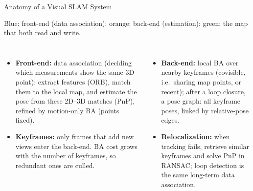 \begin{frame}{Anatomy of a Visual SLAM System}
  \vspace{0.1em}
  {\centering\scriptsize Blue: front-end (data association); orange: back-end (estimation); green: the map that both read and write.\par}
  \vspace{0.1em}
  \begin{columns}[T,onlytextwidth]
      \begin{itemize}\scriptsize\itemsep0.2em
        \item \textbf{Front-end:} data association (deciding which measurements show the same 3D point): extract features (ORB), match them to the local map, and estimate the pose from these 2D--3D matches (PnP), refined by motion-only BA (points fixed).
        \item \textbf{Keyframes:} only frames that add new views enter the back-end. BA cost grows with the number of keyframes, so redundant ones are culled.
      \end{itemize}
      \begin{itemize}\scriptsize\itemsep0.2em
        \item \textbf{Back-end:} local BA over nearby keyframes (covisible, i.e.\ sharing map points, or recent); after a loop closure, a pose graph: all keyframe poses, linked by relative-pose edges.
        \item \textbf{Relocalization:} when tracking fails, retrieve similar keyframes and solve PnP in RANSAC; loop detection is the same long-term data association.
      \end{itemize}
  \end{columns}
\end{frame}

